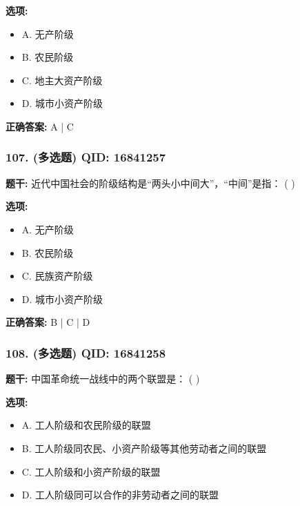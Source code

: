 \documentclass[12pt,UTF8]{ctexart}
\begin{document}
\textbf{选项:}
\begin{itemize}[leftmargin=*]

  \item A. 无产阶级

  \item B. 农民阶级

  \item C. 地主大资产阶级

  \item D. 城市小资产阶级

\end{itemize}

\textbf{正确答案:}
A | C

\vspace{0.3em}\hrulefill\vspace{0.7em}

\subsubsection*{107. (多选题) \small QID: 16841257}

\textbf{题干:}
近代中国社会的阶级结构是“两头小中间大”，“中间”是指： ( )

\textbf{选项:}
\begin{itemize}[leftmargin=*]

  \item A. 无产阶级

  \item B. 农民阶级

  \item C. 民族资产阶级

  \item D. 城市小资产阶级

\end{itemize}

\textbf{正确答案:}
B | C | D

\vspace{0.3em}\hrulefill\vspace{0.7em}

\subsubsection*{108. (多选题) \small QID: 16841258}

\textbf{题干:}
中国革命统一战线中的两个联盟是： ( )

\textbf{选项:}
\begin{itemize}[leftmargin=*]

  \item A. 工人阶级和农民阶级的联盟

  \item B. 工人阶级同农民、小资产阶级等其他劳动者之间的联盟

  \item C. 工人阶级和小资产阶级的联盟

  \item D. 工人阶级同可以合作的非劳动者之间的联盟

\end{itemize}
\end{document}
